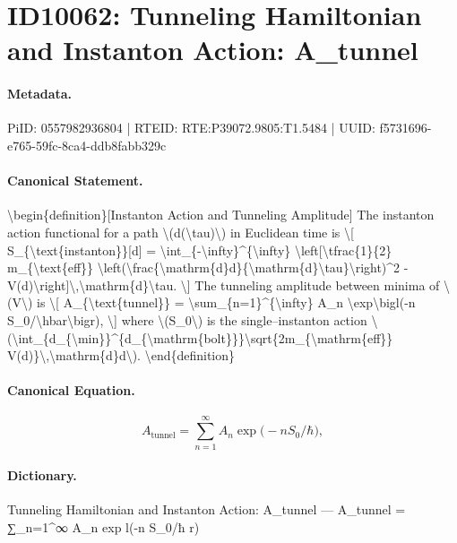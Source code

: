 \section*{ID10062: Tunneling Hamiltonian and Instanton Action: A\_tunnel}
\paragraph{Metadata.}
PiID: 0557982936804 | RTEID: RTE:P39072.9805:T1.5484 | UUID: f5731696-e765-59fc-8ca4-ddb8fabb329c

\paragraph{Canonical Statement.}
\textbackslash{}begin\{definition\}[Instanton Action and Tunneling Amplitude] The instanton action functional for a path \textbackslash{}(d(\textbackslash{}tau)\textbackslash{}) in Euclidean time is \textbackslash{}[ S\_\{\textbackslash{}text\{instanton\}\}[d] = \textbackslash{}int\_\{-\textbackslash{}infty\}\textasciicircum{}\{\textbackslash{}infty\} \textbackslash{}left[\textbackslash{}tfrac\{1\}\{2\} m\_\{\textbackslash{}text\{eff\}\} \textbackslash{}left(\textbackslash{}frac\{\textbackslash{}mathrm\{d\}d\}\{\textbackslash{}mathrm\{d\}\textbackslash{}tau\}\textbackslash{}right)\textasciicircum{}2 - V(d)\textbackslash{}right]\textbackslash{},\textbackslash{}mathrm\{d\}\textbackslash{}tau. \textbackslash{}] The tunneling amplitude between minima of \textbackslash{}(V\textbackslash{}) is \textbackslash{}[ A\_\{\textbackslash{}text\{tunnel\}\} = \textbackslash{}sum\_\{n=1\}\textasciicircum{}\{\textbackslash{}infty\} A\_n \textbackslash{}exp\textbackslash{}bigl(-n S\_0/\textbackslash{}hbar\textbackslash{}bigr), \textbackslash{}] where \textbackslash{}(S\_0\textbackslash{}) is the single–instanton action \textbackslash{}(\textbackslash{}int\_\{d\_\{\textbackslash{}min\}\}\textasciicircum{}\{d\_\{\textbackslash{}mathrm\{bolt\}\}\}\textbackslash{}sqrt\{2m\_\{\textbackslash{}mathrm\{eff\}\} V(d)\}\textbackslash{},\textbackslash{}mathrm\{d\}d\textbackslash{}). \textbackslash{}end\{definition\}

\paragraph{Canonical Equation.}
\[
A_{\text{tunnel}} = \sum_{n=1}^{\infty} A_n \exp\bigl(-n S_0/\hbar\bigr),
\]

\paragraph{Dictionary.}
Tunneling Hamiltonian and Instanton Action: A\_tunnel — A\_tunnel = ∑\_n=1\textasciicircum{}∞ A\_n exp l(-n S\_0/ħ r)

